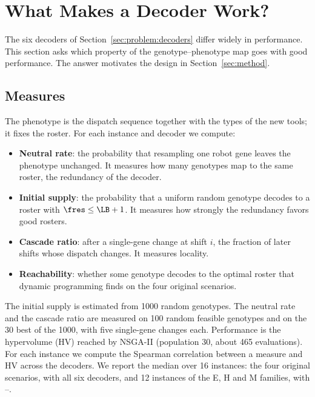 \section{What Makes a Decoder Work?}
\label{sec:repr}


The six decoders of Section~\ref{sec:problem:decoders} differ widely in performance.
This section asks which property of the genotype--phenotype map goes with good performance.
The answer motivates the design in Section~\ref{sec:method}.

\subsection{Measures}
\label{sec:repr:measures}

The phenotype is the dispatch sequence together with the types of the new tools; it fixes the roster.
For each instance and decoder we compute:
\begin{itemize}
  \item \textbf{Neutral rate}: the probability that resampling one robot gene leaves the phenotype unchanged.
  It measures how many genotypes map to the same roster, \ie the redundancy of the decoder.
  \item \textbf{Initial supply}: the probability that a uniform random genotype decodes to a roster with $\fres \le \LB + 1$.
  It measures how strongly the redundancy favors good rosters.
  \item \textbf{Cascade ratio}: after a single-gene change at shift $i$, the fraction of later shifts whose dispatch changes.
  It measures locality.
  \item \textbf{Reachability}: whether some genotype decodes to the optimal roster that dynamic programming finds on the four original scenarios.
\end{itemize}
The initial supply is estimated from 1000 random genotypes.
The neutral rate and the cascade ratio are measured on 100 random feasible genotypes and on the 30 best of the 1000, with five single-gene changes each.
Performance is the hypervolume (HV) reached by NSGA-II \cite{deb2002nsga2} (population 30, about 465 evaluations).
For each instance we compute the Spearman correlation between a measure and HV across the decoders.
We report the median over 16 instances:
the four original scenarios, with all six decoders, and 12 instances of the E, H and M families, with --.

